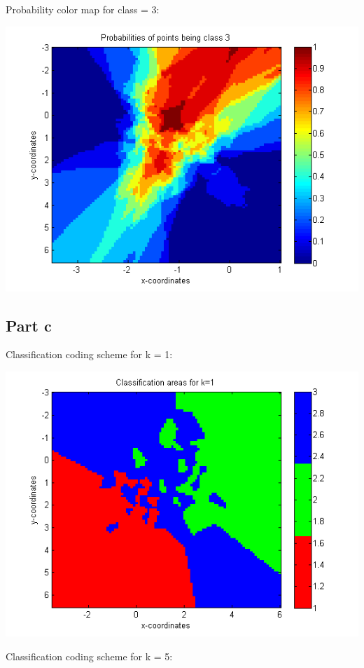 \documentclass[paper=a4, fontsize=11pt]{scrartcl} %
\numberwithin{equation}{section} %
\numberwithin{figure}{section} %
\numberwithin{table}{section} %
\begin{document}
	Probability color map for class = 3:
	
	\includegraphics{3b_class3}
	
	\subsection{Part c}
	Classification coding scheme for k = 1:
	
	\includegraphics{3c_k1}
	
	Classification coding scheme for k = 5:
	
\end{document}
